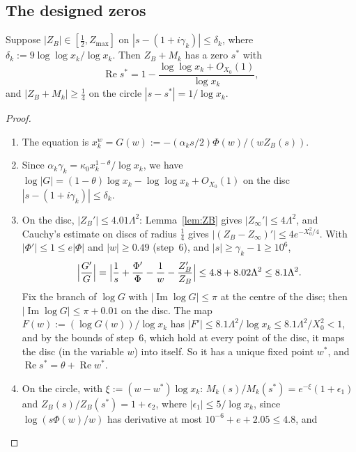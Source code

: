 \subsection{The designed zeros}
\begin{lemma}\label{lem:designedzero}
Suppose $|Z_B|\in[\tfrac12,Z_{\max}]$ on $|s-(1+i\gamma_k)|\le\delta_k$, where $\delta_k:=9\log\log x_k/\log x_k$. Then
$Z_B+M_k$ has a zero $s^*$ with
\[
  \operatorname{Re}s^*=1-\frac{\log\log x_k+O_{X_0}(1)}{\log x_k},
\]
and $|Z_B+M_k|\ge\tfrac14$ on the circle $|s-s^*|=1/\log x_k$.
\end{lemma}
\begin{proof}
\begin{enumerate}[label=\arabic*.]
\item The equation is $x_k^w=G(w):=-(\alpha_ks/2)\Phi(w)/(wZ_B(s))$.
\item Since $\alpha_k\gamma_k=\kappa_0x_k^{1-\theta}/\log x_k$, we have $\log|G|=(1-\theta)\log x_k-\log\log x_k+O_{X_0}(1)$ on the disc $|s-(1+i\gamma_k)|\le\delta_k$.
\item On the disc, $|Z_B'|\le4.01\Lambda^2$: Lemma~\ref{lem:ZB} gives $|Z_\infty'|\le4\Lambda^2$, and Cauchy's estimate on discs of radius
$\frac14$ gives $|(Z_B-Z_\infty)'|\le4e^{-X_0^2/4}$. With $|\Phi'|\le1\le e|\Phi|$ and $|w|\ge0.49$ (step~6), and $|s|\ge\gamma_k-1\ge10^6$,
\[
  \Bigl|\frac{G'}{G}\Bigr|=\Bigl|\frac1s+\frac{\Phi'}{\Phi}-\frac1w-\frac{Z_B'}{Z_B}\Bigr|\le4.8+8.02\Lambda^2\le8.1\Lambda^2.
\]
Fix the branch of $\log G$ with $|\operatorname{Im}\log G|\le\pi$ at the centre of the disc; then $|\operatorname{Im}\log G|\le\pi+0.01$
on the disc. The map $F(w):=(\log G(w))/\log x_k$ has $|F'|\le8.1\Lambda^2/\log x_k\le8.1\Lambda^2/X_0^2<1$, and by the bounds of
step~6, which hold at every point of the disc, it maps the disc (in the variable $w$) into itself. So it has a unique fixed point
$w^*$, and $\operatorname{Re}s^*=\theta+\operatorname{Re}w^*$.
\item On the circle, with $\xi:=(w-w^*)\log x_k$: $M_k(s)/M_k(s^*)=e^{-\xi}(1+\epsilon_1)$ and $Z_B(s)/Z_B(s^*)=1+\epsilon_2$, where
$|\epsilon_1|\le5/\log x_k$, since $\log(s\Phi(w)/w)$ has derivative at most $10^{-6}+e+2.05\le4.8$, and

\end{enumerate}
\end{proof}
